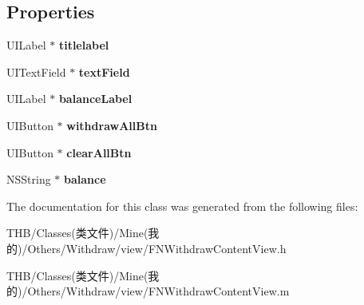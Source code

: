 \subsection*{Properties}
\begin{DoxyCompactItemize}
\item 
\mbox{\label{interface_f_n_withdraw_content_view_a3b9f3aa2ca3629e0a22642dea57635b1}} 
U\+I\+Label $\ast$ {\bfseries titlelabel}
\item 
\mbox{\label{interface_f_n_withdraw_content_view_a15583d22eeb5a87084044808237b5fb5}} 
U\+I\+Text\+Field $\ast$ {\bfseries text\+Field}
\item 
\mbox{\label{interface_f_n_withdraw_content_view_a02bf929a8e8ee5a63bf1c3f71fc8eee9}} 
U\+I\+Label $\ast$ {\bfseries balance\+Label}
\item 
\mbox{\label{interface_f_n_withdraw_content_view_a3f555d5501f03978be70ed85abdc2951}} 
U\+I\+Button $\ast$ {\bfseries withdraw\+All\+Btn}
\item 
\mbox{\label{interface_f_n_withdraw_content_view_a5d01b5137bff2636fb914e1fb832069e}} 
U\+I\+Button $\ast$ {\bfseries clear\+All\+Btn}
\item 
\mbox{\label{interface_f_n_withdraw_content_view_a8e6c2d138e2e90d03c2810ce8c487d52}} 
N\+S\+String $\ast$ {\bfseries balance}
\end{DoxyCompactItemize}


The documentation for this class was generated from the following files\+:\begin{DoxyCompactItemize}
\item 
T\+H\+B/\+Classes(类文件)/\+Mine(我的)/\+Others/\+Withdraw/view/F\+N\+Withdraw\+Content\+View.\+h\item 
T\+H\+B/\+Classes(类文件)/\+Mine(我的)/\+Others/\+Withdraw/view/F\+N\+Withdraw\+Content\+View.\+m\end{DoxyCompactItemize}
